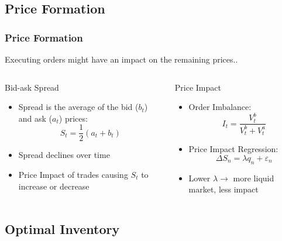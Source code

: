 \documentclass[aspectratio=1610]{beamer}
\begin{document}
\subsection{Price Formation}

\begin{frame}
  \frametitle{\hfill Price Formation}
  Executing orders might have an impact on the remaining prices..
  \begin{columns}[t]
    \begin{block}{Bid-ask Spread}
    \begin{itemize}
        \item Spread is the average of the bid ($b_t$) and ask ($a_t$) prices:
        \begin{equation}
            S_t = \frac{1}{2}(a_t + b_t)
        \end{equation}
        \item Spread declines over time
        \item Price Impact of trades causing $S_t$ to increase or decrease
    \end{itemize}
    \end{block}
    
    \begin{block}{Price Impact}
    \begin{itemize}
        \item Order Imbalance:
        \begin{equation}
            I_t = \frac{V_{t}^{b}}{V_{t}^{b} + V_{t}^{a}}
        \end{equation}
        \item Price Impact Regression:
        \begin{equation}
            \Delta S_n = \lambda q_n + \varepsilon_n
        \end{equation}
        \item Lower $\lambda \rightarrow$ more liquid market, less impact
    \end{itemize}
    \end{block}
\end{columns}


\end{frame}

\subsection{Optimal Inventory}
\end{document}
